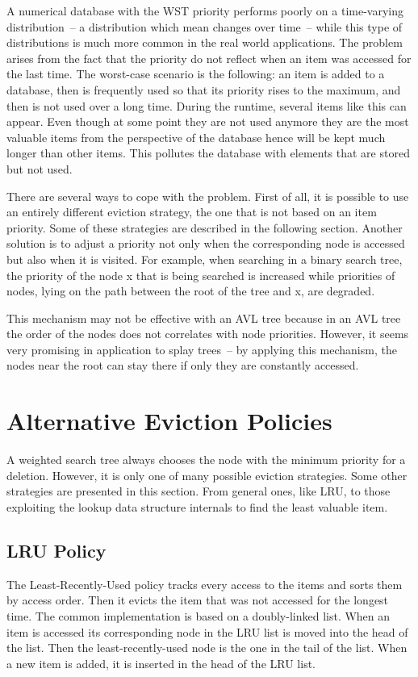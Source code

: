 A numerical database with the WST priority performs poorly on a time-varying distribution~-- a distribution which mean changes over time~-- while this type of distributions is much more common in the real world applications. The problem arises from the fact that the priority do not reflect when an item was accessed for the last time. The worst-case scenario is the following: an item is added to a database, then is frequently used so that its priority rises to the maximum, and then is not used over a long time. During the runtime, several items like this can appear. Even though at some point they are not used anymore they are the most valuable items from the perspective of the database hence will be kept much longer than other items. This pollutes the database with elements that are stored but not used.

There are several ways to cope with the problem. First of all, it is possible to use an entirely different eviction strategy, the one that is not based on an item priority. Some of these strategies are described in the following section. Another solution is to adjust a priority not only when the corresponding node is accessed but also when it is visited. For example, when searching in a binary search tree, the priority of the node x that is being searched is increased while priorities of nodes, lying on the path between the root of the tree and x, are degraded.

This mechanism may not be effective with an AVL tree because in an AVL tree the order of the nodes does not correlates with node priorities. However, it seems very promising in application to splay trees~-- by applying this mechanism, the nodes near the root can stay there if only they are constantly accessed.

\section{Alternative Eviction Policies}
A weighted search tree always chooses the node with the minimum priority for a deletion. However, it is only one of many possible eviction strategies. Some other strategies are presented in this section. From general ones, like LRU, to those exploiting the lookup data structure internals to find the least valuable item.

\subsection{LRU Policy}
The Least-Recently-Used policy tracks every access to the items and sorts them by access order. Then it evicts the item that was not accessed for the longest time. The common implementation is based on a doubly-linked list. When an item is accessed its corresponding node in the LRU list is moved into the head of the list. Then the least-recently-used node is the one in the tail of the list. When a new item is added, it is inserted in the head of the LRU list.

